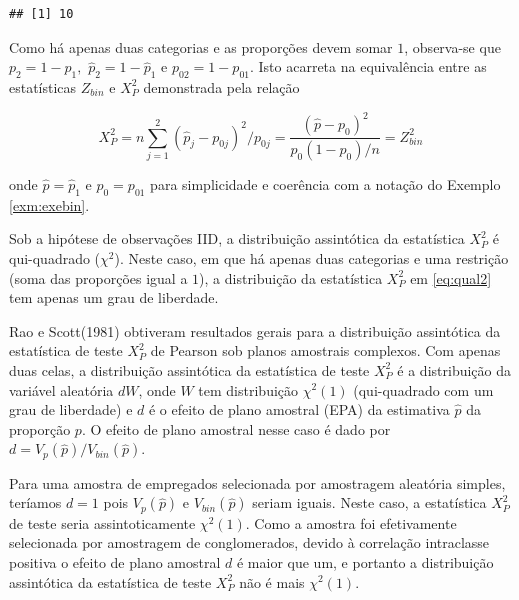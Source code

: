 \documentclass[]{book}
\theoremstyle{definition}
\theoremstyle{definition}
\theoremstyle{definition}
\theoremstyle{remark}
\begin{document}
\begin{verbatim}
## [1] 10
\end{verbatim}

Como há apenas duas categorias e as proporções devem somar \(1\),
observa-se que \(p_{2}=1-p_{1},\) \(\widehat{p}_{2}=1-\widehat{p}_{1}\)
e \(p_{02}=1-p_{01}\). Isto acarreta na equivalência entre as
estatísticas \(Z_{bin}\) e \(X_{P}^{2}\) demonstrada pela relação

\begin{equation}
X_{P}^{2}=n\sum\limits_{j=1}^{2}\left( \widehat{p}
_{j}-p_{0j}\right) ^{2}/p_{0j}=\frac{\left( \widehat{p}-p_{0}\right) ^{2}}{
p_{0}\left( 1-p_{0}\right) /n}=Z_{bin}^{2}  
\label{eq:qual2}
\end{equation}

onde \(\widehat{p}=\widehat{p}_{1}\) e \(p_{0}=p_{01}\) para
simplicidade e coerência com a notação do Exemplo \ref{exm:exebin}.

Sob a hipótese de observações IID, a distribuição assintótica da
estatística \(X_{P}^{2}\) é qui-quadrado (\(\chi^{2}\)). Neste caso, em
que há apenas duas categorias e uma restrição (soma das proporções igual
a \(1\)), a distribuição da estatística \(X_{P}^{2}\) em \eqref{eq:qual2}
tem apenas um grau de liberdade.

Rao e Scott(1981) obtiveram resultados gerais para a distribuição
assintótica da estatística de teste \(X_{P}^{2}\) de Pearson sob planos
amostrais complexos. Com apenas duas celas, a distribuição assintótica
da estatística de teste \(X_{P}^{2}\) é a distribuição da variável
aleatória \(dW\), onde \(W\) tem distribuição
\(\chi ^{2}\left( 1\right)\) (qui-quadrado com um grau de liberdade) e
\(d\) é o efeito de plano amostral (EPA) da estimativa \(\widehat{p}\)
da proporção \(p\). O efeito de plano amostral nesse caso é dado por
\(d=V_{p}\left( \widehat{p}\right) /V_{bin}\left( \widehat{p}\right)\).

Para uma amostra de empregados selecionada por amostragem aleatória
simples, teríamos \(d=1\) pois \(V_{p}\left( \widehat{p}\right)\) e
\(V_{bin}\left( \widehat{p}\right)\) seriam iguais. Neste caso, a
estatística \(X_{P}^{2}\) de teste seria assintoticamente
\(\chi ^{2}\left(1\right)\). Como a amostra foi efetivamente selecionada
por amostragem de conglomerados, devido à correlação intraclasse
positiva o efeito de plano amostral \(d\) é maior que um, e portanto a
distribuição assintótica da estatística de teste \(X_{P}^{2}\) não é
mais \(\chi ^{2}\left( 1\right)\).
\end{document}
